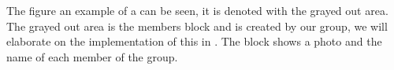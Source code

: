 The figure an example of a \block{} can be seen, it is denoted with the grayed out area.
The grayed out area is the members block and is created by our group, we will elaborate on the implementation of this in . 
The block shows a photo and the name of each member of the group. 



